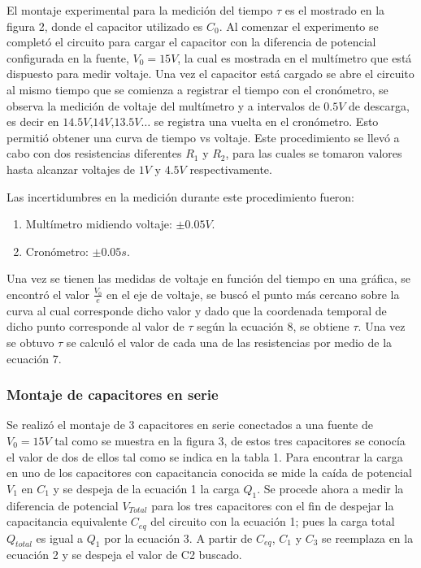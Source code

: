 \documentclass[10pt,letter]{article}
\begin{document}
\begin{multicols}{2}
El montaje experimental para la medición del tiempo $\tau$ es el mostrado en la figura 2, donde el capacitor utilizado es $C_0$. Al comenzar el experimento se completó el circuito para cargar el capacitor con la diferencia de potencial configurada en la fuente, $V_0=15V$, la cual es mostrada en el multímetro que está dispuesto para medir voltaje. Una vez el capacitor está cargado se abre el circuito al mismo tiempo que se comienza a registrar el tiempo con el cronómetro, se observa la medición de voltaje del multímetro  y a intervalos de $0.5V$ de descarga, es decir en $14.5V$,$14V$,$13.5V \dots$ se registra una vuelta en el cronómetro. Esto permitió obtener una curva de tiempo vs voltaje. Este procedimiento se llevó a cabo con dos resistencias diferentes $R_1$ y $R_2$, para las cuales se tomaron valores hasta alcanzar voltajes de $1V$ y $4.5V$ respectivamente.

\bigskip

Las incertidumbres en la medición durante este procedimiento fueron:
\begin{enumerate}
\itemsep=0em
\item Multímetro midiendo voltaje: $\pm 0.05V$.
\item Cronómetro: $\pm 0.05s$.
\end{enumerate}

Una vez se tienen las medidas de voltaje en función del tiempo en una gráfica, se encontró el valor $\frac{V_0}{e}$ en el eje de voltaje, se buscó el punto más cercano sobre la curva al cual corresponde dicho valor y dado que la coordenada temporal de dicho punto corresponde al valor de $\tau$ según la ecuación 8, se obtiene $\tau$. Una vez se obtuvo $\tau$ se calculó el valor de cada una de las resistencias por medio de la ecuación 7.


\subsubsection{Montaje de capacitores en serie}

Se realizó el montaje de 3 capacitores en serie conectados a una fuente de $V_0=15V$ tal como se muestra en la figura 3, de estos tres capacitores se conocía el valor de dos de ellos tal como se indica en la tabla 1. Para encontrar la carga en uno de los capacitores con capacitancia conocida se mide la caída de potencial $V_1$ en $C_1$ y se despeja de la ecuación 1 la carga $Q_1$. Se procede ahora a medir la  diferencia de potencial $V_{Total}$ para los tres capacitores con el fin de despejar la capacitancia equivalente $C_{eq}$ del circuito con la ecuación 1; pues la carga total $Q_{total}$ es igual a $Q_1$ por la ecuación 3. A partir de $C_{eq}$, $C_1$ y $C_3$ se reemplaza en la ecuación 2 y se despeja el valor de C2 buscado.



\end{multicols}
\end{document}
